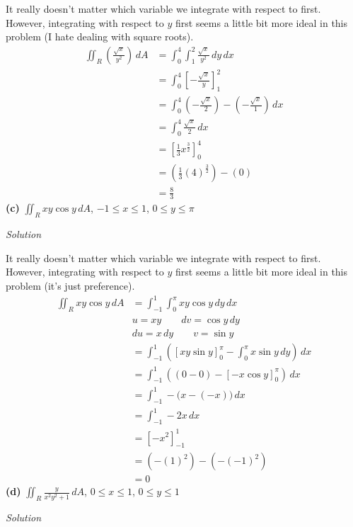 \documentclass{article}
\newcommand{\lrp}[1]{\left( #1 \right)}
\newcommand{\lrb}[1]{\left[ #1 \right]}
\newcommand{\Solution}{\textit{Solution}}
\begin{document}
It really doesn't matter which variable we integrate with respect to first. However, integrating with respect to $y$ first seems a little bit more ideal in this problem (I hate dealing with square roots).
\begin{align*}
    \iint_R\lrp{\frac{\sqrt{x}}{y^2}}\,dA&=\int_0^4\int_1^2\frac{\sqrt{x}}{y^2}\,dy\,dx\\
    &=\int_0^4\lrb{-\frac{\sqrt{x}}{y}}_1^2\\
    &=\int_0^4\lrp{-\frac{\sqrt{x}}{2}}-\lrp{-\frac{\sqrt{x}}{1}}\,dx\\
    &=\int_0^4\frac{\sqrt{x}}{2}\,dx\\
    &=\lrb{\frac{1}{3}x^{\frac{3}{2}}}_0^4\\
    &=\lrp{\frac{1}{3}(4)^{\frac{3}{2}}}-(0)\\
    &=\boxed{\frac{8}{3}}
\end{align*}
\textbf{(c)} $\displaystyle \iint_R xy\cos y\,dA$, $-1\leq x\leq 1$, $0\leq y\leq \pi$

\Solution

It really doesn't matter which variable we integrate with respect to first. However, integrating with respect to $y$ first seems a little bit more ideal in this problem (it's just preference).
\begin{align*}
    \iint_R xy\cos y\,dA&=\int_{-1}^1\int_0^\pi xy\cos y\,dy\,dx\\
    &u= xy\hspace{2em} dv=\cos y\,dy\\
    &du = x\,dy\hspace{2em}v=\sin y\\
    &=\int_{-1}^1\lrp{\lrb{xy\sin y}_0^\pi-\int_0^\pi x\sin y\,dy}\,dx\\
    &=\int_{-1}^1\lrp{(0-0)-\lrb{-x\cos y}_0^\pi}\,dx\\
    &=\int_{-1}^1-\big(x-(-x)\big)\,dx\\
    &=\int_{-1}^1 -2x\,dx\\
    &=\lrb{-x^2}_{-1}^1\\
    &=\lrp{-(1)^2}-\lrp{-(-1)^2}\\
    &=\boxed{0}
\end{align*}
\newpage
\textbf{(d)} $\displaystyle \iint_R \frac{y}{x^2y^2+1}\,dA$, $0\leq x\leq 1$, $0\leq y \leq 1$

\Solution
\end{document}

